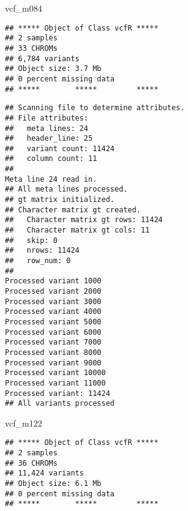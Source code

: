 \documentclass[]{article}
\newenvironment{Shaded}{\begin{snugshade}}{\end{snugshade}}
\newcommand{\DataTypeTok}[1]{\textcolor[rgb]{0.13,0.29,0.53}{#1}}
\newcommand{\KeywordTok}[1]{\textcolor[rgb]{0.13,0.29,0.53}{\textbf{#1}}}
\newcommand{\NormalTok}[1]{#1}
\newcommand{\OperatorTok}[1]{\textcolor[rgb]{0.81,0.36,0.00}{\textbf{#1}}}
\newcommand{\StringTok}[1]{\textcolor[rgb]{0.31,0.60,0.02}{#1}}
\begin{document}
\begin{Shaded}
\begin{Highlighting}[]
\NormalTok{vcf_m084}
\end{Highlighting}
\end{Shaded}

\begin{verbatim}
## ***** Object of Class vcfR *****
## 2 samples
## 33 CHROMs
## 6,784 variants
## Object size: 3.7 Mb
## 0 percent missing data
## *****        *****         *****
\end{verbatim}

\begin{Shaded}
\end{Shaded}

\begin{verbatim}
## Scanning file to determine attributes.
## File attributes:
##   meta lines: 24
##   header_line: 25
##   variant count: 11424
##   column count: 11
## 
Meta line 24 read in.
## All meta lines processed.
## gt matrix initialized.
## Character matrix gt created.
##   Character matrix gt rows: 11424
##   Character matrix gt cols: 11
##   skip: 0
##   nrows: 11424
##   row_num: 0
## 
Processed variant 1000
Processed variant 2000
Processed variant 3000
Processed variant 4000
Processed variant 5000
Processed variant 6000
Processed variant 7000
Processed variant 8000
Processed variant 9000
Processed variant 10000
Processed variant 11000
Processed variant: 11424
## All variants processed
\end{verbatim}

\begin{Shaded}
\begin{Highlighting}[]
\NormalTok{vcf_m122}
\end{Highlighting}
\end{Shaded}

\begin{verbatim}
## ***** Object of Class vcfR *****
## 2 samples
## 36 CHROMs
## 11,424 variants
## Object size: 6.1 Mb
## 0 percent missing data
## *****        *****         *****
\end{verbatim}

\begin{Shaded}
\end{Shaded}
\end{document}
